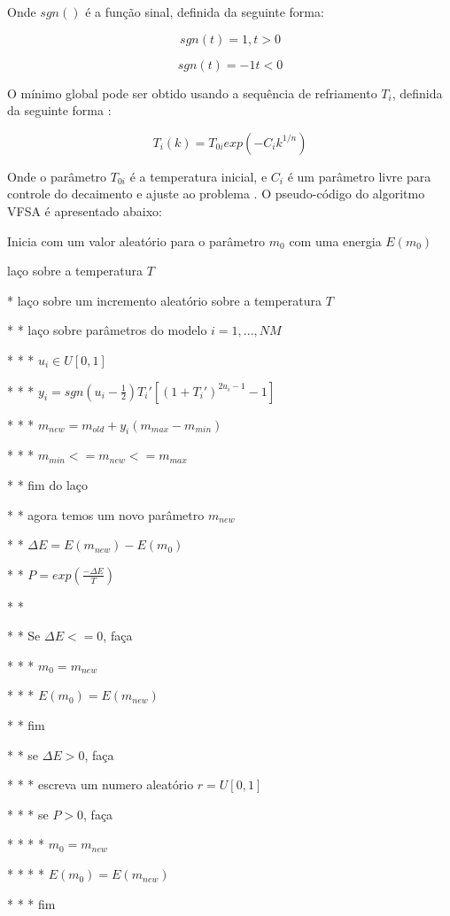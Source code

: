 Onde $sgn()$ é a função sinal, definida da seguinte forma:

$$sgn(t)=1, t > 0$$

$$sgn(t)=-1 t < 0$$


O mínimo global pode ser obtido usando a sequência de refriamento $T_i$, definida da seguinte forma \cite{ingber}:

\begin{equation}
\label{eq:2.16}
 T_i(k)=T_{0i}exp(-C_ik^{1/n})
\end{equation}

Onde o parâmetro $T_{0i}$ é a temperatura inicial, e $C_i$ é um parâmetro livre para controle do decaimento e ajuste ao
problema \cite{klaus}. O pseudo-código do algoritmo VFSA \cite{stoffa} é apresentado abaixo:

Inicia com um valor aleatório para o parâmetro $m_0$ com uma energia $E(m_0)$

laço sobre a temperatura $T$

* laço sobre um incremento aleatório sobre a temperatura $T$

* * laço sobre parâmetros do modelo $i=1,...,NM$

* * * $u_i \in U[0,1]$

* * * $y_i=sgn(u_i-\frac{1}{2})T_i'[(1+T_i')^{2u_i-1}-1]$

* * * $m_{new}=m_{old}+y_i(m_{max}-m_{min})$

* * * $m_{min}<=m_{new}<=m_{max}$

* * fim do laço

* * agora temos um novo parâmetro $m_{new}$

* * $\Delta E=E(m_{new})-E(m_0)$

* * $P=exp(\frac{-\Delta E}{T})$

* *

* * Se $\Delta E <= 0$, faça

* * * $m_0=m_{new}$

* * * $E(m_0)=E(m_{new})$

* * fim

* * se $\Delta E > 0$, faça

* * * escreva um numero aleatório $r=U[0,1]$

* * * se $P > 0$, faça

* * * * $m_0=m_{new}$

* * * * $E(m_0)=E(m_{new})$

* * * fim

